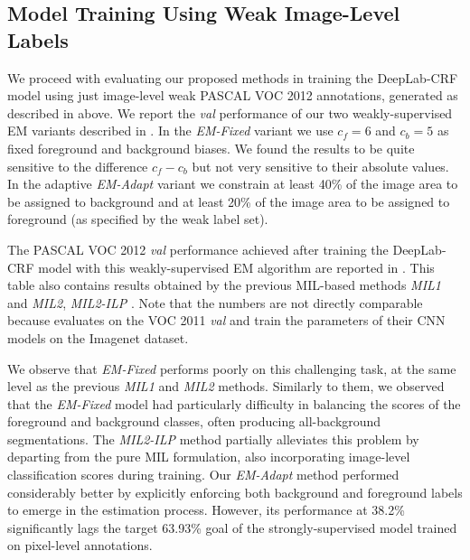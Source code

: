 
\subsection{Model Training Using Weak Image-Level Labels}
\label{sec:test_image}

We proceed with evaluating our proposed methods in training the
DeepLab-CRF model using just image-level weak PASCAL VOC 2012
annotations, generated as described in  above. We
report the \textsl{val} performance of our two weakly-supervised EM
variants described in . In the
\textsl{EM-Fixed} variant we use $c_f = 6$ and $c_b = 5$ as fixed
foreground and background biases. We found the results to be quite
sensitive to the difference $c_f-c_b$ but not very sensitive to their
absolute values. In the adaptive \textsl{EM-Adapt} variant we
constrain at least 40\% of the image area to be assigned to background
and at least 20\% of the image area to be assigned to foreground (as
specified by the weak label set). 

The PASCAL VOC 2012 \textsl{val} performance achieved after training
the DeepLab-CRF model with this weakly-supervised EM algorithm are
reported in . This table also contains results
obtained by the previous MIL-based methods \textsl{MIL1}
\citep{pathak2014fully} and \textsl{MIL2}, \textsl{MIL2-ILP}
\citep{pinheiro2014weakly}. Note that the numbers are not directly
comparable because \citet{pathak2014fully} evaluates on the VOC 2011
\textsl{val} and \citet{pinheiro2014weakly} train the parameters of
their CNN models on the Imagenet dataset. 

We observe that \textsl{EM-Fixed} performs poorly on this challenging
task, at the same level as the previous \textsl{MIL1} and \textsl{MIL2}
methods. Similarly to them, we observed that the \textsl{EM-Fixed}
model had particularly difficulty in balancing the scores of the
foreground and background classes, often producing all-background
segmentations. The \textsl{MIL2-ILP} method partially alleviates this
problem by departing from the pure MIL formulation, also incorporating
image-level classification scores during training. Our
\textsl{EM-Adapt} method performed considerably better by explicitly
enforcing both background and foreground labels to emerge in the
estimation process. However, its performance at 38.2\% significantly
lags the target 63.93\% goal of the strongly-supervised model trained
on pixel-level annotations.

